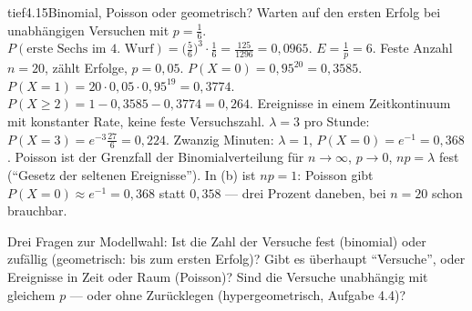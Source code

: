 \begin{loesungkarte}{tief}{4.15}{Binomial, Poisson oder geometrisch?}
Warten auf den ersten Erfolg bei unabhängigen Versuchen mit $p = \frac16$. $P(\text{erste Sechs im 4.\ Wurf}) = \bigl(\frac56\bigr)^{3}\cdot\frac16 = \frac{125}{1296} = 0{,}0965$. $E = \frac1p = 6$.
Feste Anzahl $n = 20$, zählt Erfolge, $p = 0{,}05$. $P(X = 0) = 0{,}95^{20} = 0{,}3585$. $P(X = 1) = 20\cdot0{,}05\cdot0{,}95^{19} = 0{,}3774$. $P(X\ge2) = 1 - 0{,}3585 - 0{,}3774 = 0{,}264$.
Ereignisse in einem Zeitkontinuum mit konstanter Rate, keine feste Versuchszahl. $\lambda = 3$ pro Stunde: $P(X = 3) = e^{-3}\frac{27}6 = 0{,}224$. Zwanzig Minuten: $\lambda = 1$, $P(X = 0) = e^{-1} = 0{,}368$.
Poisson ist der Grenzfall der Binomialverteilung für $n\to\infty$, $p\to0$, $np = \lambda$ fest (\enquote{Gesetz der seltenen Ereignisse}). In (b) ist $np = 1$: Poisson gibt $P(X = 0)\approx e^{-1} = 0{,}368$ statt $0{,}358$ --- drei Prozent daneben, bei $n = 20$ schon brauchbar.
\begin{mitnehmen}\kastentext
Drei Fragen zur Modellwahl: Ist die Zahl der Versuche fest (binomial) oder zufällig (geometrisch: bis zum ersten Erfolg)? Gibt es überhaupt \enquote{Versuche}, oder Ereignisse in Zeit oder Raum (Poisson)? Sind die Versuche unabhängig mit gleichem $p$ --- oder ohne Zurücklegen (hypergeometrisch, Aufgabe 4.4)?
\end{mitnehmen}
\end{loesungkarte}

